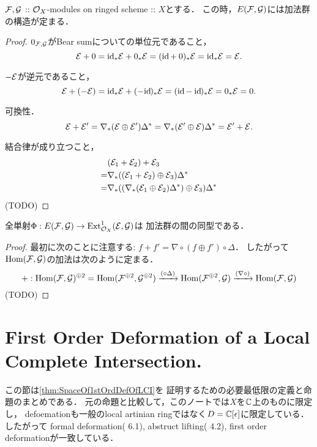 \documentclass[a4paper]{jsarticle}
\newcommand{\diag}{\Delta}
\newcommand{\codiag}{\nabla}
\begin{document}
    \begin{Lemma}
        $\shF, \shG$ :: $\shO_X$-modules on ringed scheme :: $X$とする．
        この時，$E(\shF, \shG)$には加法群の構造が定まる．
    \end{Lemma}
    \begin{proof}
        $0_{\shF, \shG}$がBear sumについての単位元であること，
        \[ \shE+0=\id[*]\shE+0_*\shE=(\id+0)_*\shE=\id[*]\shE=\shE. \]

        $-\shE$が逆元であること，
        \[ \shE+(-\shE)=\id[*]\shE+(-\id)_*\shE=(\id-\id)_*\shE=0_*\shE=0. \]

        可換性．
        \[ \shE+\shE'=\codiag_*(\shE \oplus \shE')\diag^*=\codiag_*(\shE' \oplus \shE)\diag^*=\shE'+\shE. \]

        結合律が成り立つこと，
        \begin{align*}
            {}& (\shE_1+\shE_2)+\shE_3 \\
            =&  \codiag_*((\shE_1+\shE_2) \oplus \shE_3) \diag^* \\
            =&  \codiag_*((\codiag_*(\shE_1 \oplus \shE_2)\diag^*) \oplus \shE_3) \diag^*
        \end{align*}
        (TODO)
    \end{proof}

    \begin{Lemma}\label{lemma:PhiIsIso}
        全単射$\Phi: E(\shF, \shG) \to \Ext^1_{\shO_X}(\shE, \shG)$は
        加法群の間の同型である．
    \end{Lemma}
    \begin{proof}
        最初に次のことに注意する: 
        $f+f'=\codiag \circ (f \oplus f') \circ \diag$．
        したがって$\Hom(\shF, \shG)$の加法は次のように定まる．
        \[
            +: \Hom(\shF, \shG)^{\oplus 2}=\Hom(\shF^{\oplus 2}, \shG^{\oplus 2}) \xrightarrow{(\circ \diag)}
            \Hom(\shF^{\oplus 2}, \shG) \xrightarrow{(\codiag \circ)}
            \Hom(\shF, \shG)
        \]
        (TODO)
    \end{proof}

\section{First Order Deformation of a Local Complete Intersection.}
    この節は\ref{thm:SpaceOf1stOrdDefOfLCI}を
    証明するための必要最低限の定義と命題のまとめである．
    元の命題と比較して，このノートでは$X$を$\C$上のものに限定し，
    defoemationも一般のlocal artinian ringではなく$D=\C[\epsilon]$に限定している．
    したがって
    formal deformation(\cite{DefLCI} 6.1),
    abstruct lifting(\cite{DefLCI} 4.2), 
    first order deformationが一致している．
\end{document}
